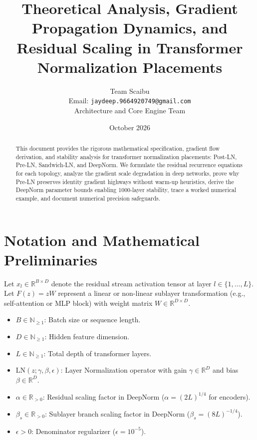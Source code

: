 \documentclass[11pt,a4paper]{article}
\title{\textbf{Theoretical Analysis, Gradient Propagation Dynamics, and Residual Scaling in Transformer Normalization Placements}}
\author{Team Scaibu \\ \small Email: \texttt{jaydeep.9664920749@gmail.com} \\ \small Architecture and Core Engine Team}
\date{October 2026}
\theoremstyle{definition}
\begin{document}
\maketitle

\begin{abstract}
This document provides the rigorous mathematical specification, gradient flow derivation, and stability analysis for transformer normalization placements: Post-LN, Pre-LN, Sandwich-LN, and DeepNorm. We formulate the residual recurrence equations for each topology, analyze the gradient scale degradation in deep networks, prove why Pre-LN preserves identity gradient highways without warm-up heuristics, derive the DeepNorm parameter bounds enabling 1000-layer stability, trace a worked numerical example, and document numerical precision safeguards.
\end{abstract}

\section{Notation and Mathematical Preliminaries}

Let $x_l \in \mathbb{R}^{B \times D}$ denote the residual stream activation tensor at layer $l \in \{1, \dots, L\}$. Let $F(z) = z W$ represent a linear or non-linear sublayer transformation (e.g., self-attention or MLP block) with weight matrix $W \in \mathbb{R}^{D \times D}$.

\begin{itemize}
    \item $B \in \mathbb{N}_{\ge 1}$: Batch size or sequence length.
    \item $D \in \mathbb{N}_{\ge 1}$: Hidden feature dimension.
    \item $L \in \mathbb{N}_{\ge 1}$: Total depth of transformer layers.
    \item $\text{LN}(z; \gamma, \beta, \epsilon)$: Layer Normalization operator with gain $\gamma \in \mathbb{R}^D$ and bias $\beta \in \mathbb{R}^D$.
    \item $\alpha \in \mathbb{R}_{> 0}$: Residual scaling factor in DeepNorm ($\alpha = (2L)^{1/4}$ for encoders).
    \item $\beta_s \in \mathbb{R}_{> 0}$: Sublayer branch scaling factor in DeepNorm ($\beta_s = (8L)^{-1/4}$).
    \item $\epsilon > 0$: Denominator regularizer ($\epsilon = 10^{-5}$).
\end{itemize}
\end{document}
